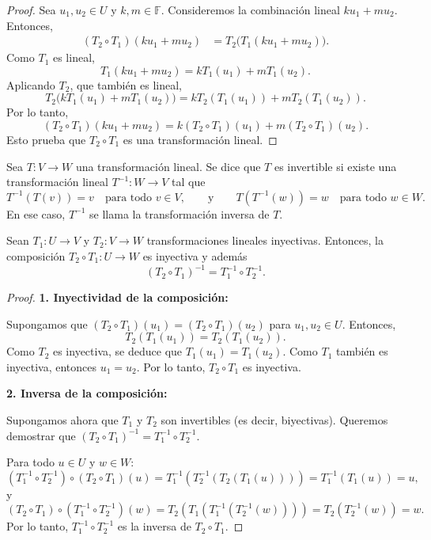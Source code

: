 \begin{proof}
Sea $u_1, u_2 \in U$ y $k, m \in \mathbb{F}$. Consideremos la combinación lineal $k u_1 + m u_2$. Entonces,
\begin{align*}
(T_2 \circ T_1)(k u_1 + m u_2) &= T_2\big(T_1(k u_1 + m u_2)\big).
\end{align*}
Como $T_1$ es lineal,
\[
T_1(k u_1 + m u_2) = k T_1(u_1) + m T_1(u_2).
\]
Aplicando $T_2$, que también es lineal,
\[
T_2\big(k T_1(u_1) + m T_1(u_2)\big) = k T_2(T_1(u_1)) + m T_2(T_1(u_2)).
\]
Por lo tanto,
\[
(T_2 \circ T_1)(k u_1 + m u_2) = k (T_2 \circ T_1)(u_1) + m (T_2 \circ T_1)(u_2).
\]
Esto prueba que $T_2 \circ T_1$ es una transformación lineal.
\end{proof}


\begin{definition}
Sea $T: V \to W$ una transformación lineal. Se dice que $T$ es invertible si existe una transformación lineal $T^{-1}: W \to V$ tal que
\[
T^{-1}(T(v)) = v \quad \text{para todo } v \in V, \qquad \text{y} \qquad T(T^{-1}(w)) = w \quad \text{para todo } w \in W.
\]
En ese caso, $T^{-1}$ se llama la transformación inversa de $T$.
\end{definition}

\begin{theorem}
Sean $T_1: U \to V$ y $T_2: V \to W$ transformaciones lineales inyectivas. Entonces, la composición $T_2 \circ T_1: U \to W$ es inyectiva y además
\[
(T_2 \circ T_1)^{-1} = T_1^{-1} \circ T_2^{-1}.
\]
\begin{proof}
\textbf{1. Inyectividad de la composición:}

Supongamos que $(T_2 \circ T_1)(u_1) = (T_2 \circ T_1)(u_2)$ para $u_1, u_2 \in U$. Entonces,
\[
T_2(T_1(u_1)) = T_2(T_1(u_2)).
\]
Como $T_2$ es inyectiva, se deduce que $T_1(u_1) = T_1(u_2)$. Como $T_1$ también es inyectiva, entonces $u_1 = u_2$. Por lo tanto, $T_2 \circ T_1$ es inyectiva.

\textbf{2. Inversa de la composición:}

Supongamos ahora que $T_1$ y $T_2$ son invertibles (es decir, biyectivas). Queremos demostrar que $(T_2 \circ T_1)^{-1} = T_1^{-1} \circ T_2^{-1}$.

Para todo $u \in U$ y $w \in W$:
\[
(T_1^{-1} \circ T_2^{-1}) \circ (T_2 \circ T_1)(u) = T_1^{-1}(T_2^{-1}(T_2(T_1(u)))) = T_1^{-1}(T_1(u)) = u,
\]
y
\[
(T_2 \circ T_1) \circ (T_1^{-1} \circ T_2^{-1})(w) = T_2(T_1(T_1^{-1}(T_2^{-1}(w)))) = T_2(T_2^{-1}(w)) = w.
\]
Por lo tanto, $T_1^{-1} \circ T_2^{-1}$ es la inversa de $T_2 \circ T_1$.
\end{proof}
\end{theorem}


